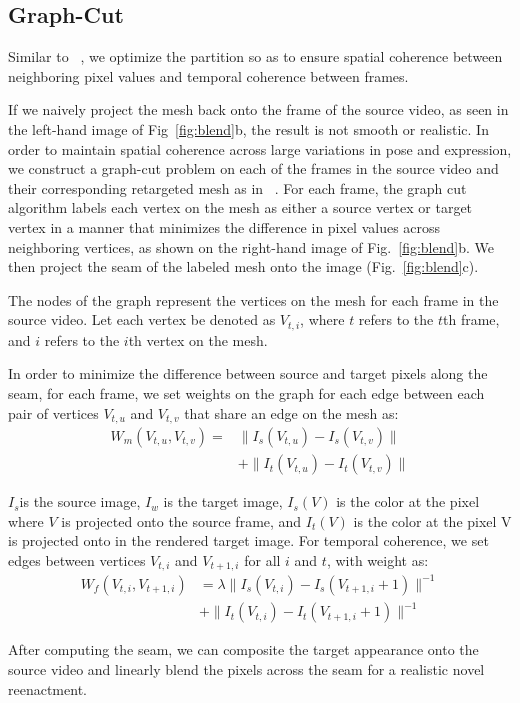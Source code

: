 \subsection{Graph-Cut}
Similar to ~\cite{replace}, 
we optimize the partition so as to ensure spatial coherence between neighboring pixel values
and temporal coherence between frames. 


If we naively project the mesh back onto the frame of the source video, as seen in the left-hand image of Fig~\ref{fig:blend}b, the result is not smooth or realistic. 
In order to maintain spatial coherence across large variations in pose and expression, 
 we construct a graph-cut problem on each of the frames in the source video and their corresponding retargeted mesh as in ~\cite{graphcut}. For each frame, the graph cut algorithm labels each vertex on the mesh as either a source vertex or target vertex in a manner that minimizes the difference in pixel values across neighboring vertices, as shown on the right-hand image of Fig.~\ref{fig:blend}b. We then project the seam of the labeled mesh onto the image (Fig.~\ref{fig:blend}c). 

The nodes of the graph represent the vertices on the mesh for each frame in the source video. 
Let each vertex be denoted as $V_{t,i}$, where $t$ refers to the $t$th frame, and $i$ refers to the $i$th vertex on the mesh. 

In order to minimize the difference between source and target pixels along the seam, for each frame, we set weights on the graph for each edge between each pair of vertices $V_{t,u}$ and  $V_{t,v}$ that share an edge on the mesh as:
\begin{equation}
\begin{split}
W_m(V_{t,u}, V_{t,v}) = & \|I_{s}(V_{t,u})-I_{s}(V_{t,v})\|\\
& + \|I_{t}(V_{t,u})-I_{t}(V_{t, v})\| 
\end{split}
\end{equation}

 $I_{s}$is the source image, $I_{w}$ is the target image, $I_{s}(V)$ is the color at the pixel where $V$ is projected onto the source frame, and $I_{t}(V)$ is the color at the pixel V is projected onto in the rendered target image.
 For temporal coherence, we set edges between vertices $V_{t,i}$ and $V_{t+1,i}$ for all $i$ and $t$, with weight as:
\begin{equation}
\begin{split}
W_f(V_{t,i}, V_{t+1,i})& = \lambda \|I_{s}(V_{t,i})-I_{s}(V_{t+1,i} +1)\|^{-1}\\
              & + \|I_{t}(V_{t,i})-I_{t}(V_{t+1,i} + 1)\|^{-1}
\end{split}
\end{equation}

After computing the seam, we can composite the target appearance onto the source video and linearly blend the pixels across the seam for a realistic novel reenactment.  






